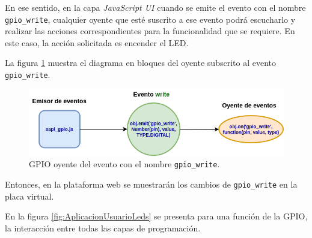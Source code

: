 En ese sentido, en la capa \textit{JavaScript UI}  cuando se emite el evento con el nombre \texttt{gpio\_write}, cualquier oyente que esté suscrito a ese evento podrá escucharlo y realizar las acciones correspondientes para la funcionalidad que se requiere. En este caso, la acción solicitada es encender el LED.

La figura \ref{fig:ListeningGPIOEventEmitter} muestra el diagrama en bloques del oyente subscrito al evento \texttt{gpio\_write}.


\begin{figure}[ht]
	\centering
	\includegraphics[scale=.40]{./Figures/ListeningGPIOEventEmitter.png}
	\caption{GPIO oyente del evento con el nombre \texttt{gpio\_write}.}
	\label{fig:ListeningGPIOEventEmitter}
\end{figure}

Entonces, en la plataforma web se muestrarán los cambios de \texttt{gpio\_write} en la placa virtual. 

En la figura \ref{fig:AplicacionUsuarioLeds} se presenta para una función de la GPIO, la interacción entre todas las capas de programación.


